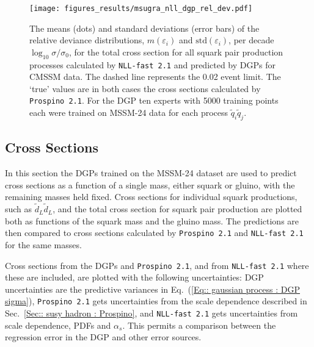 \documentclass[twoside,english]{uiofysmaster}
\begin{document}
{{\begin{figure}
\centering
\texttt{[image: figures\_results/msugra\_nll\_dgp\_rel\_dev.pdf]}
\caption{The means (dots) and standard deviations (error bars) of the relative deviance distributions, $m(\varepsilon_i)$ and $\mathrm{std}(\varepsilon_i)$, per decade $\log_{10} \sigma / \sigma_0$, for the total cross section for all squark pair production processes calculated by {\tt NLL-fast 2.1} and predicted by DGPs for CMSSM data. The dashed line represents the 0.02 event limit. The `true' values are in both cases the cross sections calculated by {\tt Prospino 2.1}. For the DGP ten experts with 5000 training points each were trained on MSSM-24 data for each process $\widetilde{q}_i \widetilde{q}_j$.}
\label{Fig:: results : RD CMSSM}
\end{figure}

\subsection{Cross Sections}\label{Sec:: results : Cross Sections}

In this section the DGPs trained on the MSSM-24 dataset are used to predict cross sections as a function of a single mass, either squark or gluino, with the remaining masses held fixed. Cross sections for individual squark productions, such as $\widetilde{d}_L \widetilde{d}_L$, and the total cross section for squark pair production are plotted both as functions of the squark mass and the gluino mass. The predictions are then compared to cross sections calculated by \verb|Prospino 2.1| and \verb|NLL-fast 2.1| for the same masses.

Cross sections from the DGPs and \verb|Prospino 2.1|, and from \verb|NLL-fast 2.1| where these are included, are plotted with the following uncertainties: DGP uncertainties are the predictive variances in Eq.~(\ref{Eq:: gaussian process : DGP sigma}), \verb|Prospino 2.1| gets uncertainties from the scale dependence described in Sec.~\ref{Sec:: susy hadron : Prospino}, and \verb|NLL-fast 2.1| gets uncertainties from scale dependence, PDFs and $\alpha_s$. This permits a comparison between the regression error in the DGP and other error sources.

}}
\end{document}
